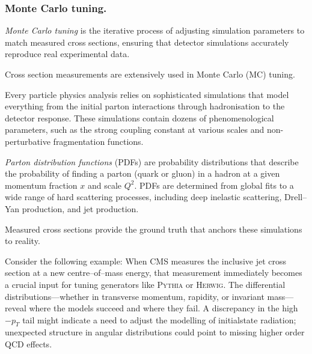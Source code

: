\begin{definition}
        \subsubsection{Monte Carlo tuning.}
            \begin{definition}
                \emph{Monte Carlo tuning} is the iterative process of adjusting simulation parameters to match measured cross sections, ensuring that detector simulations accurately reproduce real experimental data.
            \end{definition}
            Cross section measurements are extensively used in Monte Carlo (MC) tuning.
            
            Every particle physics analysis relies on sophisticated simulations that model everything from the initial parton interactions through hadronisation to the detector response.
            These simulations contain dozens of phenomenological parameters, such as the strong coupling constant at various scales and non-perturbative fragmentation functions.
            \begin{definition}
                \emph{Parton distribution functions} (PDFs) are probability distributions that describe the probability of finding a parton (quark or gluon) in a hadron at a given momentum fraction \(x\) and scale \(Q^2\).
                PDFs are determined from global fits to a wide range of hard scattering processes, including deep inelastic scattering, Drell--Yan production, and jet production.
            \end{definition}
            Measured cross sections provide the ground truth that anchors these simulations to reality.

            Consider the following example:
            When CMS measures the inclusive jet cross section at a new centre--of--mass energy, that measurement immediately becomes a crucial input for tuning generators like \textsc{Pythia} or \textsc{Herwig}.
            The differential distributions---whether in transverse momentum, rapidity, or invariant mass---reveal where the models succeed and where they fail.
            A discrepancy in the high\(-p_T\) tail might indicate a need to adjust the modelling of initialstate radiation; unexpected structure in angular distributions could point to missing higher order QCD effects.

\end{definition}
